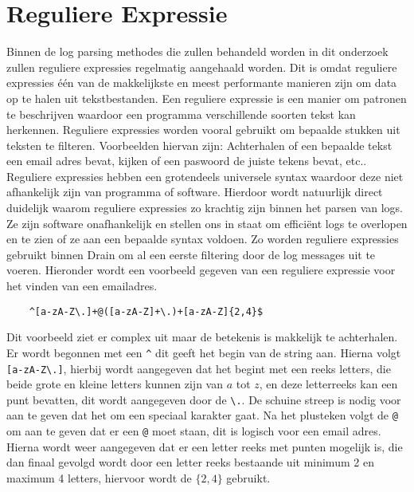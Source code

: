 \section{Reguliere Expressie}
Binnen de log parsing methodes die zullen behandeld worden in dit onderzoek zullen reguliere expressies regelmatig aangehaald worden. Dit is omdat reguliere expressies één van de makkelijkste en meest performante manieren zijn om data op te halen uit tekstbestanden. Een reguliere expressie is een manier om patronen te beschrijven waardoor een programma verschillende soorten tekst kan herkennen. Reguliere expressies worden vooral gebruikt om bepaalde stukken uit teksten te filteren. Voorbeelden hiervan zijn: Achterhalen of een bepaalde tekst een email adres bevat, kijken of een paswoord de juiste tekens bevat, etc.. Reguliere expressies hebben een grotendeels universele syntax waardoor deze niet afhankelijk zijn van programma of software. Hierdoor wordt natuurlijk direct duidelijk waarom reguliere expressies zo krachtig zijn binnen het parsen van logs. Ze zijn software onafhankelijk en stellen ons in staat om efficiënt logs te overlopen en te zien of ze aan een bepaalde syntax voldoen. Zo worden reguliere expressies gebruikt binnen Drain om al een eerste filtering door de log messages uit te voeren. Hieronder wordt een voorbeeld gegeven van een reguliere expressie voor het vinden van een emailadres.
\begin{verbatim}
    ^[a-zA-Z\.]+@([a-zA-Z]+\.)+[a-zA-Z]{2,4}$
\end{verbatim}

Dit voorbeeld ziet er complex uit maar de betekenis is makkelijk te achterhalen. Er wordt begonnen met een \verb!^! dit geeft het begin van de string aan. Hierna volgt \verb![a-zA-Z\.]!, hierbij wordt aangegeven dat het begint met een reeks letters, die beide grote en kleine letters kunnen zijn van \(a\) tot \(z\), en deze letterreeks kan een punt bevatten, dit wordt aangegeven door de \verb!\.!. De schuine streep is nodig voor aan te geven dat het om een speciaal karakter gaat. Na het plusteken volgt de \verb!@! om aan te geven dat er een \verb!@! moet staan, dit is logisch voor een email adres. Hierna wordt weer aangegeven dat er een letter reeks met punten mogelijk is, die dan finaal gevolgd wordt door een letter reeks bestaande uit minimum 2 en maximum 4 letters, hiervoor wordt de \(\{2,4\}\) gebruikt.\\

